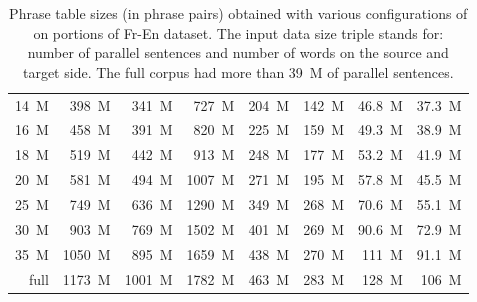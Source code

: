\begin{table}[!htb]
\begin{tabular}{ | r  r  r | r  r  r  r  r | }
14~M & 398~M & 341~M & 727~M & 204~M & 142~M & 46.8~M & 37.3~M \\
16~M & 458~M & 391~M & 820~M & 225~M & 159~M & 49.3~M & 38.9~M \\
18~M & 519~M & 442~M & 913~M & 248~M & 177~M & 53.2~M & 41.9~M \\
20~M & 581~M & 494~M & 1007~M & 271~M & 195~M & 57.8~M & 45.5~M \\
25~M & 749~M & 636~M & 1290~M & 349~M & 268~M & 70.6~M & 55.1~M \\
30~M & 903~M & 769~M & 1502~M & 401~M & 269~M & 90.6~M & 72.9~M \\
35~M & 1050~M & 895~M & 1659~M & 438~M & 270~M & 111~M & 91.1~M \\
full & 1173~M & 1001~M & 1782~M & 463~M & 283~M & 128~M & 106~M \\
\hline
\end{tabular}
\caption{\label{fr-en-output-size-benchmarking}
Phrase table sizes (in phrase pairs) obtained with various configurations of \eppex{}
on portions of Fr-En dataset. The input data size triple stands for: number of
parallel sentences and number of words on the source and target side.
The full corpus had more than 39~M of parallel sentences.}
\end{table}

